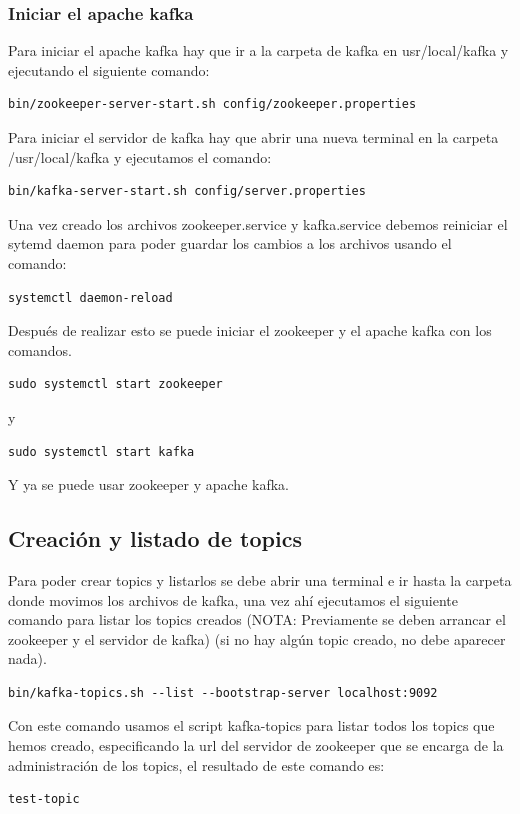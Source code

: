\documentclass{article}
\begin{document}
\subsubsection{Iniciar el apache kafka}
Para iniciar el apache kafka hay que ir a la carpeta de kafka en usr/local/kafka y ejecutando el siguiente comando:
\begin{lstlisting}[numbers=none]
    bin/zookeeper-server-start.sh config/zookeeper.properties\end{lstlisting}
Para iniciar el servidor de kafka hay que abrir una nueva terminal en la carpeta /usr/local/kafka y ejecutamos el comando:
\begin{lstlisting}[numbers=none]
    bin/kafka-server-start.sh config/server.properties\end{lstlisting}
Una vez creado los archivos zookeeper.service y kafka.service debemos reiniciar el sytemd daemon para poder guardar los cambios a los archivos usando el comando:
\begin{lstlisting}[numbers=none]
    systemctl daemon-reload\end{lstlisting}
Después de realizar esto se puede iniciar el zookeeper y el apache kafka con los comandos.
\begin{lstlisting}[numbers=none]
    sudo systemctl start zookeeper\end{lstlisting}
y
\begin{lstlisting}[numbers=none]
    sudo systemctl start kafka\end{lstlisting}
Y ya se puede usar zookeeper y apache kafka.

\subsection{Creación y listado de topics }
Para poder crear topics y listarlos se debe abrir una terminal e ir hasta la carpeta donde movimos los archivos de kafka, una vez ahí ejecutamos el siguiente comando para listar los topics creados (NOTA: Previamente se deben arrancar el zookeeper y el servidor de kafka)  (si no hay algún topic creado, no debe aparecer nada). 
\begin{lstlisting}[numbers=none]
    bin/kafka-topics.sh --list --bootstrap-server localhost:9092\end{lstlisting}
Con este comando usamos el script kafka-topics para listar todos los topics que hemos creado, especificando la url del servidor de zookeeper que se encarga de la administración de los topics, el resultado de este comando es:
\begin{lstlisting}[numbers=none]
    test-topic\end{lstlisting}
\end{document}
